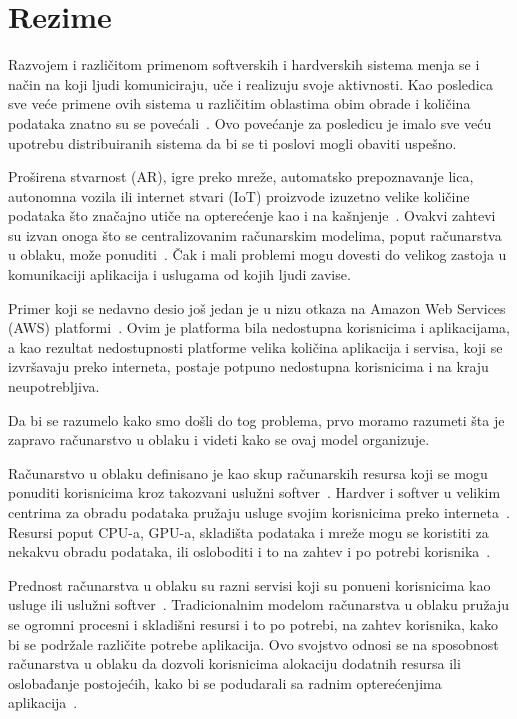 \chapter*{Rezime}
\pagestyle{plain}

Razvojem i razli\v citom primenom softverskih i hardverskih sistema menja se i na\v cin na koji ljudi komuniciraju, u\v ce i realizuju svoje aktivnosti. Kao posledica sve ve\'ce primene ovih sistema u razli\v citim oblastima obim obrade i koli\v cina podataka znatno su se pove\'cali~\cite{ChiangZ16}. Ovo pove\'canje za posledicu je imalo sve ve\'cu upotrebu distribuiranih sistema da bi se ti poslovi mogli obaviti uspe\v sno.

Pro\v sirena stvarnost (AR), igre preko mre\v ze, automatsko prepoznavanje lica, autonomna vozila ili internet stvari (IoT) proizvode izuzetno velike koli\v cine podataka \v sto zna\v cajno uti\v ce na opterećenje kao i na ka\v snjenje~\cite{ChiangZ16}. Ovakvi zahtevi su izvan onoga \v sto se centralizovanim ra\v cunarskim modelima, poput ra\v cunarstva u oblaku, mo\v ze ponuditi~\cite{ChiangZ16}. \v Cak i mali problemi mogu dovesti do velikog zastoja u komunikaciji aplikacija i uslugama od kojih ljudi zavise.  

Primer koji se nedavno desio jo\v s jedan je u nizu otkaza na Amazon Web Services (AWS) platformi~\cite{GunawiHSLSAE16}. Ovim je platforma bila nedostupna korisnicima i aplikacijama, a kao rezultat nedostupnosti platforme velika koli\v cina aplikacija i servisa, koji se izvr\v savaju preko interneta, postaje potpuno nedostupna korisnicima i na kraju neupotrebljiva. 

Da bi se razumelo kako smo do\v sli do tog problema, prvo moramo razumeti \v sta je zapravo ra\v cunarstvo u oblaku i videti kako se ovaj model organizuje.

Ra\v cunarstvo u oblaku definisano je kao skup ra\v cunarskih resursa koji se mogu ponuditi korisnicima kroz takozvani uslu\v zni softver~\cite{Vogels}. Hardver i softver u velikim centrima za obradu podataka pru\v zaju usluge svojim korisnicima preko interneta~\cite {AboveTheCloud}. Resursi poput CPU-a, GPU-a, skladi\v sta podataka i mre\v ze mogu se koristiti za nekakvu obradu podataka, ili osloboditi i to na zahtev i po potrebi korisnika~\cite{ZhangCB10}. 

Prednost ra\v cunarstva u oblaku su razni servisi koji su ponu\dj eni korisnicima kao usluge ili uslu\v zni softver~\cite{Vogels}. Tradicionalnim modelom ra\v cunarstva u oblaku pružaju se ogromni procesni i skladi\v sni resursi i to po potrebi, na zahtev korisnika, kako bi se podr\v zale razli\v cite potrebe aplikacija. Ovo svojstvo odnosi se na sposobnost ra\v cunarstva u oblaku da dozvoli korisnicima alokaciju dodatnih resursa ili oslobađanje postoje\'cih, kako bi se podudarali sa radnim optere\'cenjima aplikacija~\cite{AssuncaoVB18}. 

